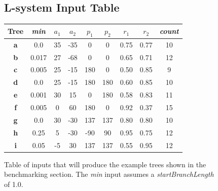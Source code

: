 \documentclass[final]{cmpreport}
\begin{document}
\begin{figure}[ht]
    \subsection{L-system Input Table}
    \label{app:input-table}
    \begin{tabular}{||c c c c c c c c c||} 
        \hline
        \textbf{Tree} & \emph{min} & $a_1$ & $a_2$ & $p_1$ & $p_2$ & $r_1$ & $r_2$ & \emph{count}\\ [0.5ex] 
        \hline
        \textbf{a} & 0.0 & 35 & -35 & 0 & 0 & 0.75 & 0.77 & 10 \\ 
        \hline
        \textbf{b} & 0.017 & 27 & -68 & 0 & 0 & 0.65 & 0.71 & 12 \\ 
        \hline
        \textbf{c} & 0.005 & 25 & -15 & 180 & 0 & 0.50 & 0.85 & 9 \\ 
        \hline
        \textbf{d} & 0.0 & 25 & -15 & 180 & 180 & 0.60 & 0.85 & 10 \\ 
        \hline
        \textbf{e} & 0.001 & 30 & 15 & 0 & 180 & 0.58 & 0.83 & 11 \\ 
        \hline
        \textbf{f} & 0.005 & 0 & 60 & 180 & 0 & 0.92 & 0.37 & 15 \\ 
        \hline
        \textbf{g} & 0.0 & 30 & -30 & 137 & 137 & 0.80 & 0.80 & 10 \\ 
        \hline
        \textbf{h} & 0.25 & 5 & -30 & -90 & 90 & 0.95 & 0.75 & 12 \\ 
        \hline
        \textbf{i} & 0.05 & -5 & 30 & 137 & 137 & 0.55 & 0.95 & 12 \\ [0.5ex]
        \hline
    \end{tabular}
    \centering
    \captionsetup{justification=centering}
    \caption{Table of inputs that will produce the example trees shown in the benchmarking section. 
             The \emph{min} input assumes a \emph{startBranchLength} of 1.0.}
\end{figure}
\end{document}
